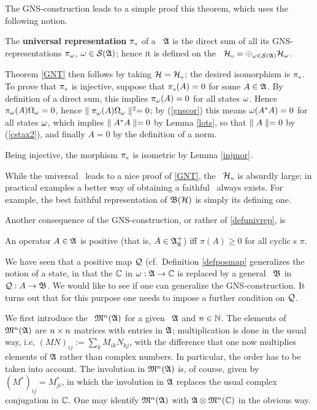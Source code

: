 The GNS-construction leads to a simple proof this theorem, which uses
the following notion.
\begin{Definition} 
The {\bf universal representation} $\pi_{\mbox{\tiny u}}$ of a \ca\
${\frak A}$ is the direct sum of all its GNS-representations $\pi_{\omega}$,
$\omega\in {\cal S}({\frak A})$; hence it is defined on the \Hs\ ${\cal H}_{\mbox{\tiny
u}}=\oplus_{\omega\in{\cal S}({\frak A})}{\cal H}_{\omega}$.
\end{Definition}

Theorem \ref{GNT} then follows by taking ${\cal H}={\cal H}_{\mbox{\tiny u}}$; the
desired isomorphism is $\pi_{\mbox{\tiny u}}$.  To prove that
$\pi_{\mbox{\tiny u}}$ is injective, suppose that $\pi_{\mbox{\tiny
u}}(A)=0$ for some $A\in{\frak A}$. By definition of a direct sum, this
implies $\pi_{\omega}(A)=0$ for all states $\omega$.  Hence
$\pi_{\omega}(A)\Omega_{\omega}=0$, hence $\parallel\pi_{\omega}(A)\Omega_{\omega}\parallel^2=0$; by
(\ref{gnscor}) this means $\omega(A^*A)=0$ for all states $\omega$, which
implies $\parallel A^*A\parallel=0$ by Lemma \ref{lots}, so that $\parallel A\parallel=0$ by
(\ref{cstax2}), and finally $A=0$ by the definition of a norm.

Being injective, the morphism $\pi_{\mbox{\tiny u}}$ is isometric by
Lemma \ref{injmor}.\enp

While the universal \rep\ leads to a nice proof of \ref{GNT}, the \Hs\
 ${\cal H}_{\mbox{\tiny u}}$ is absurdly large; in practical examples a
 better way of obtaining a faithful \rep\ always exists. For example,
 the best faithful representation of ${\frak B}({\cal H})$ is simply its defining one.

Another consequence of the GNS-construction, or rather of
 \ref{defunivrep}, is
\begin{Corollary}\ll{posposrep}
An operator $A\in{\frak A}$ is positive (that is, $A\in{\frak A}_{\Bbb R}^+$) iff
$\pi(A)\geq 0$ for all cyclic \rep s $\pi$.
\end{Corollary}
 We have seen that a positive map
${\cal Q}$ (cf.\ Definition \ref{defposmap} generalizes the notion of a
state, in that the ${\Bbb C}$ in $\omega:{\frak A}\rightarrow{\Bbb C}$ is replaced by a general
\ca\ ${\frak B}$ in ${\cal Q}:A\rightarrow{\frak B}$.  We would like to see if one can
generalize the GNS-construction.  It turns out that for this purpose
one needs to impose a further condition on ${\cal Q}$.

We first introduce the \ca\ ${\frak M}^n({\frak A})$ for a given \ca\ ${\frak A}$ and
$n\in{\Bbb N}$.  The elements of ${\frak M}^n({\frak A})$ are $n\times n$ matrices with
entries in ${\frak A}$; multiplication is done in the usual way, i.e,
$(MN)_{ij}:=\sum_k M_{ik}N_{kj}$, with the difference that one now
multiplies elements of ${\frak A}$ rather than complex numbers. In
particular, the order has to be taken into account.  The involution in
${\frak M}^n({\frak A})$ is, of course, given by $(M^*)_{ij}=M_{ji}^*$, in which the
involution in ${\frak A}$ replaces the usual complex conjugation in ${\Bbb C}$.
One may identify ${\frak M}^n({\frak A})$ with ${\frak A}\otimes{\frak M}^n({\Bbb C})$ in the obvious way.

